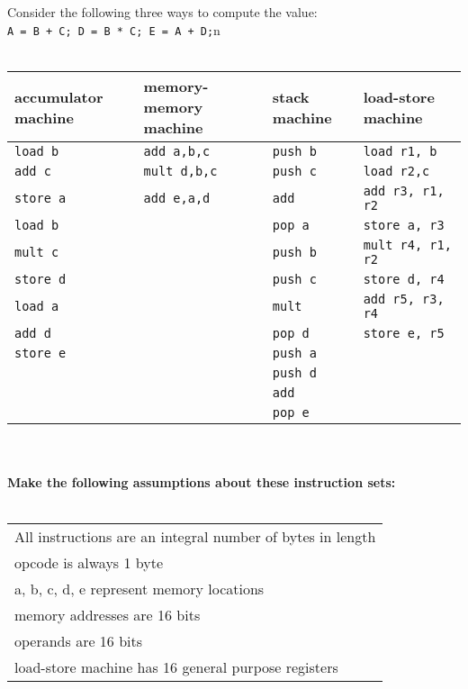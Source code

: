 \documentclass{article}
\begin{document}
\section{}
Consider the following three ways to compute the value:\\
\texttt{A = B + C; D = B * C; E = A + D;}n\\
\\
\begin{tabular}{|l|l|l|l|}
\hline
accumulator machine & memory-memory machine & stack machine & load-store machine \\ \hline
\texttt{load b} & \texttt{add a,b,c} & \texttt{push b} & \texttt{load r1, b} \\ 
\texttt{add c} & \texttt{mult d,b,c} & \texttt{push c} & \texttt{load r2,c} \\
\texttt{store a} & \texttt{add e,a,d} & \texttt{add} & \texttt{add r3, r1, r2} \\
\texttt{load b} & & \texttt{pop a} & \texttt{store a, r3} \\
\texttt{mult c} & & \texttt{push b} & \texttt{mult r4, r1, r2} \\
\texttt{store d} & & \texttt{push c} & \texttt{store d, r4} \\ 
\texttt{load a} & & \texttt{mult} & \texttt{add r5, r3, r4} \\
\texttt{add d} & & \texttt{pop d} & \texttt{store e, r5} \\
\texttt{store e} & & \texttt{push a} & \\
& & \texttt{push d} & \\ 
& & \texttt{add} & \\
& & \texttt{pop e} & \\
\hline
\end{tabular}\\
\\
\textbf{Make the following assumptions about these instruction sets: }\\
\\
\begin{tabular}{|l|}
\hline
All instructions are an integral number of bytes in length \\
opcode is always 1 byte \\
a, b, c, d, e represent memory locations \\ 
memory addresses are 16 bits \\
operands are 16 bits \\
load-store machine has 16 general purpose registers \\
\hline
\end{tabular} \\
\\
\end{document}
